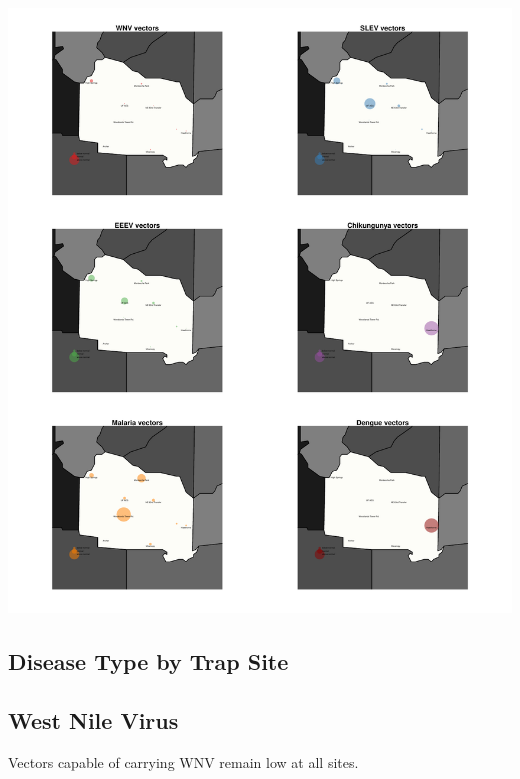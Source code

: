 \documentclass{article}
\begin{document}
\begin{center}
\includegraphics{mosq28oct13-007}
\end{center}
\newpage

\begin{center}
\section*{Disease Type by Trap Site}

\subsection*{West Nile Virus}

\end{center}

Vectors capable of carrying WNV remain low at all sites.\\
\end{document}
